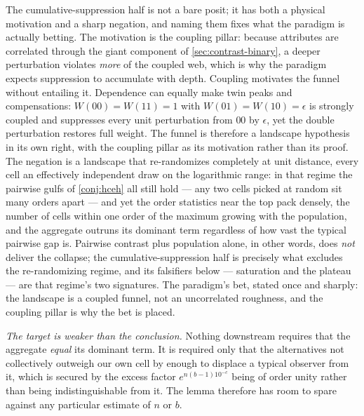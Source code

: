 \documentclass[11pt]{article}
\theoremstyle{definition}
\begin{document}
The cumulative-suppression half is not a bare posit; it has both a physical motivation and a sharp negation, and naming them fixes what the paradigm is actually betting. The motivation is the coupling pillar: because attributes are correlated through the giant component of \autoref{sec:contrast-binary}, a deeper perturbation violates \emph{more} of the coupled web, which is why the paradigm expects suppression to accumulate with depth. Coupling motivates the funnel without entailing it. Dependence can equally make twin peaks and compensations: $W(00) = W(11) = 1$ with $W(01) = W(10) = \epsilon$ is strongly coupled and suppresses every unit perturbation from $00$ by $\epsilon$, yet the double perturbation restores full weight. The funnel is therefore a landscape hypothesis in its own right, with the coupling pillar as its motivation rather than its proof. The negation is a landscape that re-randomizes completely at unit distance, every cell an effectively independent draw on the logarithmic range: in that regime the pairwise gulfs of \autoref{conj:hceh} all still hold --- any two cells picked at random sit many orders apart --- and yet the order statistics near the top pack densely, the number of cells within one order of the maximum growing with the population, and the aggregate outruns its dominant term regardless of how vast the typical pairwise gap is. Pairwise contrast plus population alone, in other words, does \emph{not} deliver the collapse; the cumulative-suppression half is precisely what excludes the re-randomizing regime, and its falsifiers below --- saturation and the plateau --- are that regime's two signatures. The paradigm's bet, stated once and sharply: the landscape is a coupled funnel, not an uncorrelated roughness, and the coupling pillar is why the bet is placed.





\emph{The target is weaker than the conclusion.} Nothing downstream requires that the aggregate \emph{equal} its dominant term. It is required only that the alternatives not collectively outweigh our own cell by enough to displace a typical observer from it, which is secured by the excess factor $e^{n(b-1)10^{-c}}$ being of order unity rather than being indistinguishable from it. The lemma therefore has room to spare against any particular estimate of $n$ or $b$.
\end{document}
